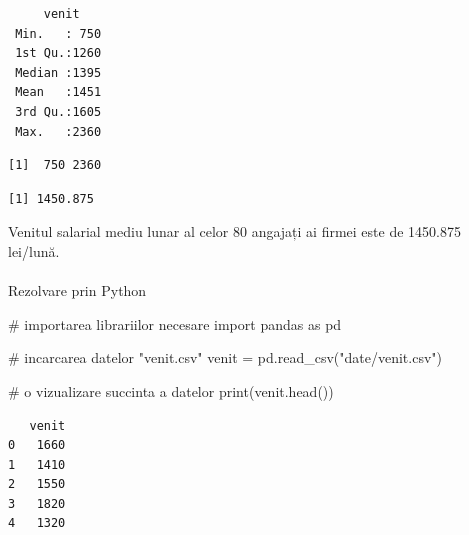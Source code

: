 \documentclass[
  11pt,
  b5paper,
  nottoc]{book}
\makeatletter
\let\oldparagraph\paragraph
\renewcommand{\paragraph}{
    \@ifstar
      \xxxParagraphStar
      \xxxParagraphNoStar
  }
\newcommand{\xxxParagraphStar}[1]{\oldparagraph*{#1}\mbox{}}
\newcommand{\xxxParagraphNoStar}[1]{\oldparagraph{#1}\mbox{}}
\newenvironment{Shaded}{\begin{snugshade}}{\end{snugshade}}
\newcommand{\BuiltInTok}[1]{\textcolor[rgb]{0.00,0.23,0.31}{#1}}
\newcommand{\CommentTok}[1]{\textcolor[rgb]{0.37,0.37,0.37}{#1}}
\newcommand{\FunctionTok}[1]{\textcolor[rgb]{0.28,0.35,0.67}{#1}}
\newcommand{\ImportTok}[1]{\textcolor[rgb]{0.00,0.46,0.62}{#1}}
\newcommand{\NormalTok}[1]{\textcolor[rgb]{0.00,0.23,0.31}{#1}}
\newcommand{\OperatorTok}[1]{\textcolor[rgb]{0.37,0.37,0.37}{#1}}
\newcommand{\SpecialCharTok}[1]{\textcolor[rgb]{0.37,0.37,0.37}{#1}}
\newcommand{\StringTok}[1]{\textcolor[rgb]{0.13,0.47,0.30}{#1}}
\makeatother
\begin{document}
\begin{verbatim}
     venit     
 Min.   : 750  
 1st Qu.:1260  
 Median :1395  
 Mean   :1451  
 3rd Qu.:1605  
 Max.   :2360  
\end{verbatim}

\begin{Shaded}
\end{Shaded}

\begin{verbatim}
[1]  750 2360
\end{verbatim}

\begin{Shaded}
\end{Shaded}

\begin{verbatim}
[1] 1450.875
\end{verbatim}

Venitul salarial mediu lunar al celor 80 angajați ai firmei este de
1450.875 lei/lună.

\paragraph{Rezolvare prin Python}\label{rezolvare-prin-python}

\begin{Shaded}
\begin{Highlighting}[]
\CommentTok{\# importarea librariilor necesare}
\ImportTok{import}\NormalTok{ pandas }\ImportTok{as}\NormalTok{ pd}

\CommentTok{\# incarcarea datelor "venit.csv"}
\NormalTok{venit }\OperatorTok{=}\NormalTok{ pd.read\_csv(}\StringTok{"date/venit.csv"}\NormalTok{)}

\CommentTok{\# o vizualizare succinta a datelor}
\BuiltInTok{print}\NormalTok{(venit.head())}
\end{Highlighting}
\end{Shaded}

\begin{verbatim}
   venit
0   1660
1   1410
2   1550
3   1820
4   1320
\end{verbatim}
\end{document}
